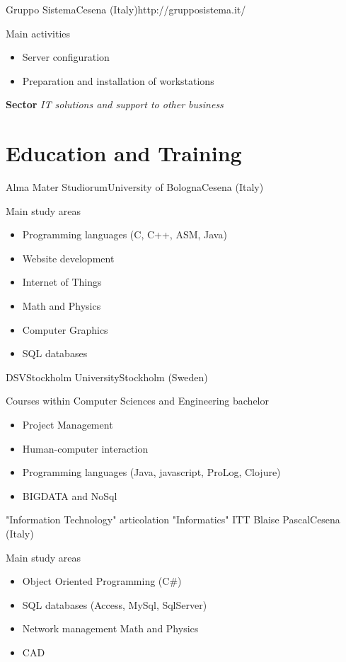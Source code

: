 \documentclass[11pt,a4paper,sans]{moderncv}
\begin{document}
{\newline Gruppo Sistema}{Cesena (Italy)}{http://grupposistema.it/}{
	Main activities
	\begin{itemize}
	\item Server configuration
	\item Preparation and installation of workstations
	\end{itemize}
	\textbf{Sector}
	\textit{IT solutions and support to other business}
}

\newpage
\section{Education and Training}

{\newline Alma Mater Studiorum}{University of Bologna}{Cesena (Italy)}{
	Main study areas
	\begin{itemize}
	\item Programming languages (C, C++, ASM, Java)
	\item Website development
	\item Internet of Things
	\item Math and Physics
	\item Computer Graphics
	\item SQL databases
	\end{itemize}
}

{\newline DSV}{Stockholm University}{Stockholm (Sweden)}{
	Courses within Computer Sciences and Engineering bachelor
	\begin{itemize}
	\item Project Management
	\item Human-computer interaction
	\item Programming languages (Java, javascript, ProLog, Clojure)
	\item BIGDATA and NoSql
	\end{itemize}
}

{"Information Technology" articolation "Informatics"}
{\newline ITT Blaise Pascal}{Cesena (Italy)}{
	Main study areas
	\begin{itemize}
	\item Object Oriented Programming (C\#)
	\item SQL databases (Access, MySql, SqlServer)
	\item Network management
	\itme Math and Physics
	\item CAD
	\end{itemize}
}
\end{document}
